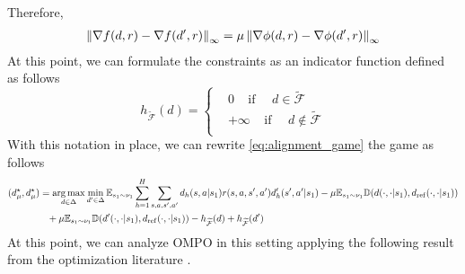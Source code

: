 Therefore,
\begin{align*}
    \left\lVert\nabla f(d,r) - \nabla f(d',r)\right\rVert_{\infty} = \mu \left\lVert\nabla \phi(d,r) - \nabla \phi(d',r)\right\rVert_{\infty}
\end{align*}
At this point, we can 
formulate the constraints as an indicator function defined as follows
\begin{equation*}
    h_{\widetilde{\mathcal{F}}}(d) = \begin{cases}
& 0 ~~~~~ \text{if} ~~~~~~ d \in \widetilde{\mathcal{F}} \\
& +\infty ~~~~~ \text{if} ~~~~~~ d \notin \widetilde{\mathcal{F}} \\
    \end{cases}
\end{equation*}
With this notation in place, we can rewrite \ref{eq:alignment_game} the game as follows
\begin{align*}
(d^\star_\mu, d^\star_\mu) &= \operatorname*{arg\,max}_{d\in\Delta} \min_{d'\in\Delta} \mathbb{E}_{s_1 \sim \nu_1}\sum^H_{h=1}\sum_{s,a,s',a'}  d_h(s,a | s_1)r(s,a,s',a') d_h'(s',a'|s_1) - \mu \mathbb{E}_{s_1 \sim \nu_1} \mathbb{D}(d(\cdot,\cdot|s_1),d_{\mathrm{ref}}(\cdot,\cdot|s_1)) \nonumber \\&\phantom{=}
    + \mu \mathbb{E}_{s_1 \sim \nu_1} \mathbb{D}(d'(\cdot,\cdot|s_1),d_{\mathrm{ref}}(\cdot,\cdot|s_1)) - h_{\widetilde{\mathcal{F}}}(d) + h_{\widetilde{\mathcal{F}}}(d')
\end{align*}
At this point, we can analyze OMPO in this setting applying the following result from the optimization literature \cite{jiang2022generalized}.
\fi
